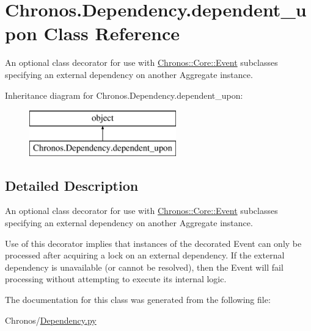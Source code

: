 \hypertarget{classChronos_1_1Dependency_1_1dependent__upon}{}\section{Chronos.\+Dependency.\+dependent\+\_\+upon Class Reference}
\label{classChronos_1_1Dependency_1_1dependent__upon}


An optional class decorator for use with \hyperlink{classChronos_1_1Core_1_1Event}{Chronos\+::\+Core\+::\+Event} subclasses specifying an external dependency on another Aggregate instance.  


Inheritance diagram for Chronos.\+Dependency.\+dependent\+\_\+upon\+:\begin{figure}[H]
\begin{center}
\leavevmode
\includegraphics[height=2.000000cm]{classChronos_1_1Dependency_1_1dependent__upon}
\end{center}
\end{figure}


\subsection{Detailed Description}
An optional class decorator for use with \hyperlink{classChronos_1_1Core_1_1Event}{Chronos\+::\+Core\+::\+Event} subclasses specifying an external dependency on another Aggregate instance. 

Use of this decorator implies that instances of the decorated Event can only be processed after acquiring a lock on an external dependency. If the external dependency is unavailable (or cannot be resolved), then the Event will fail processing without attempting to execute its internal logic. 

The documentation for this class was generated from the following file\+:\begin{DoxyCompactItemize}
\item 
Chronos/\hyperlink{Dependency_8py}{Dependency.\+py}\end{DoxyCompactItemize}
